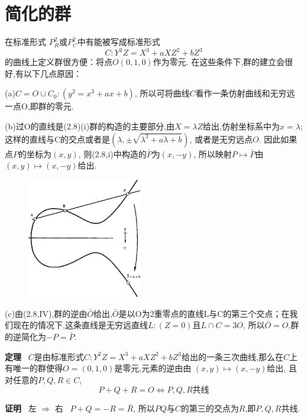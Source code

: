 \documentclass[UTF8]{book}
\begin{document}
	\section{简化的群}
		在标准形式
		$P^{2}_{R}$或$P^{2}_{C}$中有能被写成标准形式
		\begin{equation*}
		C:Y^{2}Z=X^{3}+aXZ^{2}+bZ^{3}
		\end{equation*}
		的曲线上定义群很方便：将点$ O(0,1,0) $作为零元. 在这些条件下,群的建立会很好,有以下几点原因：
		
		(a)$C={O}\cup C_{0}:(y^{2}=x^{3}+ax+b)$, 所以可将曲线$ C $看作一条仿射曲线和无穷远一点O,即群的零元.
		
		(b)过O的直线是(2.8)(i)群的构造的主要部分,由$X=\lambda Z$给出,仿射坐标系中为$x=\lambda$; 这样的直线与C的交点或者是$(\lambda,\pm \sqrt{\lambda^{3}+a\lambda+b})$, 或者是无穷远点$ O $. 因此如果点$ P $的坐标为$ (x,y) $, 则(2.8,i)中构造的$\bar{P}$为$ (x,-y) $, 所以映射$P\mapsto\bar{P}$由 $(x,y)\mapsto(x,-y)$给出.
		
		\begin{figure}[h]
		  \centering
		  \includegraphics[width=5cm]{39.jpg}\\
		\end{figure}
	
	
	
		(c)由(2.8,IV),群的逆由$\bar{O}$给出,$\bar{O}$是以O为2重零点的直线L与C的第三个交点；在我们现在的情况下,这条直线是无穷远直线$ L:(Z=0) $且$L\cap C=3O$, 所以$\bar{O}=O$,群的逆简化为$-P=\bar{P}$.
		
		
		\textbf{定理} \
		$ C $是由标准形式$C:Y^{2}Z=X^{3}+aXZ^{2}+bZ^{3}$给出的一条三次曲线,那么在$ C $上有唯一的群使得$ O=(0,1,0) $是零元,元素的逆由由 $(x,y)\mapsto(x,-y)$给出, 且对任意的$P,Q,R\in C$,
		\begin{equation*}
			P+Q+R=O \Longleftrightarrow P,Q,R\text{共线}
		\end{equation*}
		
		
		\justifying	
		\textbf{证明} \ 左 $\Rightarrow$ 右 \   $P+Q=-R=\bar{R}$, 所以$ PQ $与$ C $的第三的交点为$ R $,即$ P,Q,R $共线.
		
\end{document}
